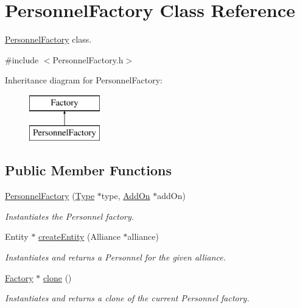 \hypertarget{classPersonnelFactory}{}\section{Personnel\+Factory Class Reference}
\label{classPersonnelFactory}


\hyperlink{classPersonnelFactory}{Personnel\+Factory} class.  




{\ttfamily \#include $<$Personnel\+Factory.\+h$>$}

Inheritance diagram for Personnel\+Factory\+:\begin{figure}[H]
\begin{center}
\leavevmode
\includegraphics[height=2.000000cm]{classPersonnelFactory}
\end{center}
\end{figure}
\subsection*{Public Member Functions}
\begin{DoxyCompactItemize}
\item 
\hyperlink{classPersonnelFactory_a71cd406976230cacebfcfd723d2a2615}{Personnel\+Factory} (\hyperlink{classType}{Type} $\ast$type, \hyperlink{classAddOn}{Add\+On} $\ast$add\+On)
\begin{DoxyCompactList}\small\item\em Instantiates the Personnel factory. \end{DoxyCompactList}\item 
Entity $\ast$ \hyperlink{classPersonnelFactory_abc720e96cd8f136156c8f427a2489653}{create\+Entity} (Alliance $\ast$alliance)
\begin{DoxyCompactList}\small\item\em Instantiates and returns a Personnel for the given alliance. \end{DoxyCompactList}\item 
\hyperlink{classFactory}{Factory} $\ast$ \hyperlink{classPersonnelFactory_ad60e8371e52153294112b16a7a97cc2d}{clone} ()
\begin{DoxyCompactList}\small\item\em Instantiates and returns a clone of the current Personnel factory. \end{DoxyCompactList}\end{DoxyCompactItemize}


